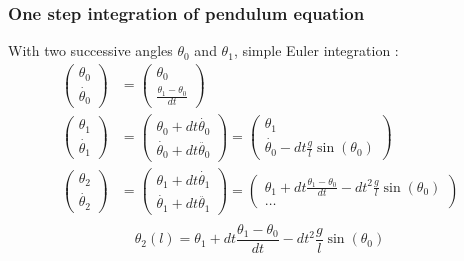 \documentclass{beamer}
\begin{document}
\begin{frame}
\frametitle{One step integration of pendulum equation}
With two successive angles $\theta_0$ and $\theta_1$, simple Euler integration :
\begin{align*}
  \left( \begin{array}{c} \theta_0 \\ \dot{\theta_0} \end{array} \right)&=
    \left( \begin{array}{c} \theta_0 \\ \frac{\theta_1 - \theta_0}{dt} \end{array} \right) \\
  \left( \begin{array}{c} \theta_1 \\ \dot{\theta_1} \end{array} \right) &=
    \left( \begin{array}{c} \theta_0  + dt \dot{\theta_0} \\ \dot{\theta_0} + dt \ddot{\theta_0} \end{array} \right)
    =
    \left( \begin{array}{c} \theta_1 \\ \dot{\theta_0} - dt \frac{g}{l} \sin(\theta_0) \end{array} \right)\\
  \left( \begin{array}{c} \theta_2 \\ \dot{\theta_2} \end{array} \right) &=
    \left( \begin{array}{c} \theta_1  + dt \dot{\theta_1} \\ \dot{\theta_1} + dt \ddot{\theta_1} \end{array} \right)
    =
    \left( \begin{array}{c} \theta_1 + dt \frac{\theta_1 - \theta_0}{dt} - dt^2 \frac{g}{l} \sin(\theta_0) \\ \ldots \end{array} \right)\\
\end{align*}
\[
  \theta_2 (l) = \theta_1 + dt \frac{\theta_1 - \theta_0}{dt} - dt^2 \frac{g}{l} \sin(\theta_0)
\]
\end{frame}
\end{document}

